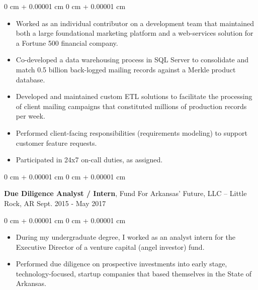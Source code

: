 \documentclass[10pt, letterpaper]{article}
\newenvironment{highlights}{
    \begin{itemize}[
        topsep=0.10 cm,
        parsep=0.10 cm,
        partopsep=0pt,
        itemsep=0pt,
        leftmargin=0 cm + 10pt
    ]
}{
    \end{itemize}
} %
\newenvironment{onecolentry}{
    \begin{adjustwidth}{
        0 cm + 0.00001 cm
    }{
        0 cm + 0.00001 cm
    }
}{
    \end{adjustwidth}
} %
\newenvironment{twocolentry}[2][]{
    \onecolentry
    \def\secondColumn{#2}
    \setcolumnwidth{\fill, 4.5 cm}
    \begin{paracol}{2}
}{
    \switchcolumn \raggedleft \secondColumn
    \end{paracol}
    \endonecolentry
} %
\begin{document}
        \vspace{0.10 cm}
        \begin{onecolentry}
            \begin{highlights}
                \item Worked as an individual contributor on a development team that maintained both a large foundational marketing platform and a web-services solution for a Fortune 500 financial company.
                \item Co-developed a data warehousing process in SQL Server to consolidate and match 0.5 billion back-logged mailing records against a Merkle product database.
                \item Developed and maintained custom ETL solutions to facilitate the processing of client mailing campaigns that constituted millions of production records per week.
                \item Performed client-facing responsibilities (requirements modeling) to support customer feature requests.
                \item Participated in 24x7 on-call duties, as assigned.
            \end{highlights}
        \end{onecolentry}

        \vspace{0.75 cm}

        \begin{twocolentry}{
            Sept. 2015 - May 2017
        }
            \textbf{Due Diligence Analyst / Intern}, Fund For Arkansas' Future, LLC -- Little Rock, AR\end{twocolentry}

        \vspace{0.10 cm}
        \begin{onecolentry}
            \begin{highlights}
                \item During my undergraduate degree, I worked as an analyst intern for the Executive Director of a venture capital (angel investor) fund.
                \item Performed due diligence on prospective investments into early stage, technology-focused, startup companies that based themselves in the State of Arkansas.
            \end{highlights}
        \end{onecolentry}
    
\end{document}
